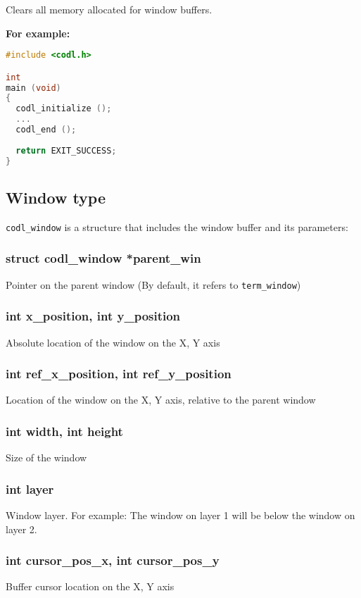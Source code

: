 \documentclass{article}
\begin{document}
\noindent\smallskip Clears all memory allocated for window buffers.

{\vspace{5mm}\noindent\bf\large For example:}

\begin{lstlisting}[language=C]
#include <codl.h>

int
main (void)
{
  codl_initialize ();
  ...
  codl_end ();
  
  return EXIT_SUCCESS;
}
\end{lstlisting}

\subsection{Window type}
{\tt codl\_window} is a structure that includes the window buffer and its parameters:

\subsubsection*{struct codl\_window *parent\_win}
Pointer on the parent window (By default, it refers to {\tt term\_window})

\subsubsection*{int x\_position, int y\_position}
Absolute location of the window on the X, Y axis

\subsubsection*{int ref\_x\_position, int ref\_y\_position}
Location of the window on the X, Y axis, relative to the parent window

\subsubsection*{int width, int height}
Size of the window

\subsubsection*{int layer}
Window layer. For example: The window on layer 1 will be below the window on
layer 2.

\subsubsection*{int cursor\_pos\_x, int cursor\_pos\_y}
Buffer cursor location on the X, Y axis
\end{document}
